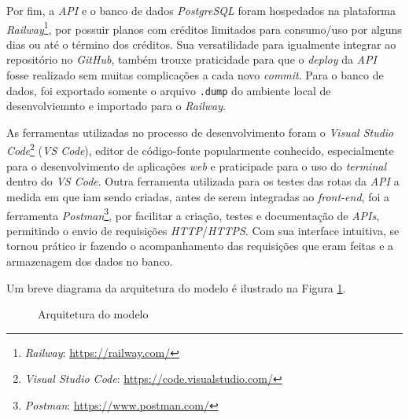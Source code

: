 \documentclass[english,brazilian]{UNISINOSartigo} %
\begin{document}
Por fim, a \textit{API} e o banco de dados \textit{PostgreSQL} foram hospedados na plataforma \textit{Railway}\footnote{\textit{Railway}: \url{https://railway.com/}}, por possuir planos com créditos limitados para consumo/uso por alguns dias ou até o término dos créditos. Sua versatilidade para igualmente integrar ao repositório no \textit{GitHub}, também trouxe praticidade para que o \textit{deploy} da \textit{API} fosse realizado sem muitas complicações a cada novo \textit{commit}. Para o banco de dados, foi exportado somente o arquivo \texttt{.dump} do ambiente local de desenvolviemnto e importado para o \textit{Railway}.

As ferramentas utilizadas no processo de desenvolvimento foram o \textit{Visual Studio Code}\footnote{\textit{Visual Studio Code}: \url{https://code.visualstudio.com/}} (\textit{VS Code}), editor de código-fonte popularmente conhecido, especialmente para o desenvolvimento de aplicações \textit{web} e praticipade para o uso do \textit{terminal} dentro do \textit{VS Code}. Outra ferramenta utilizada para os testes das rotas da \textit{API} a medida em que iam sendo criadas, antes de serem integradas ao \textit{front-end}, foi a ferramenta \textit{Postman}\footnote{\textit{Postman}: \url{https://www.postman.com/}}, por facilitar a criação, testes e documentação de \textit{APIs}, permitindo o envio de requisições \textit{HTTP}/\textit{HTTPS}. Com sua interface intuitiva, se tornou prático ir fazendo o acompanhamento das requisições que eram feitas e a armazenagem dos dados no banco.

Um breve diagrama da arquitetura do modelo é ilustrado na Figura \ref{fig:arquitetura}.

\begin{figure}[ht]
    \caption{Arquitetura do modelo}
    \label{fig:arquitetura}
    \centering
    \footnotesize
    \begin{minipage}{.9\textwidth}
        \centering
    \end{minipage}
\end{figure}
\FloatBarrier
\end{document}
